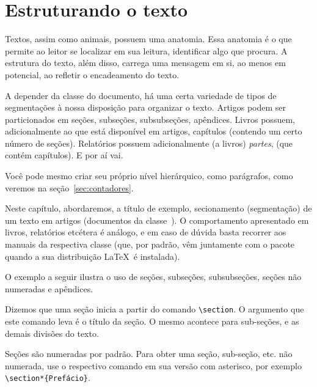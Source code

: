 \section{Estruturando o texto}

Textos, assim como animais, possuem uma anatomia. Essa anatomia é o que permite ao leitor se localizar em sua leitura, identificar algo que procura. A estrutura do texto, além disso, carrega uma mensagem em si, ao menos em potencial, ao refletir o encadeamento do texto.

A depender da classe do documento, há uma certa variedade de tipos de segmentações à nossa disposição para organizar o texto.
Artigos podem ser particionados em seções, subseções, subsubseções, apêndices.
Livros possuem, adicionalmente ao que está disponível em artigos, capítulos (contendo um certo número de seções).
Relatórios possuem adicionalmente (a livros) \emph{partes}, (que contém capítulos).
E por aí vai.

Você pode mesmo criar seu próprio nível hierárquico, como parágrafos, como veremos na seção~\ref{sec:contadores}.

Neste capítulo, abordaremos, a título de exemplo, secionamento (segmentação) de um texto em artigos (documentos da classe~). O comportamento apresentado em livros, relatórios etcétera é análogo, e em caso de dúvida basta recorrer aos manuais da respectiva classe (que, por padrão, vêm juntamente com o pacote quando a sua distribuição \LaTeX\ é instalada).

O exemplo a seguir ilustra o uso de seções, subseções, subsubseções, seções não numeradas e apêndices.


\medskip
{\footnotesize}

\medskip

Dizemos que uma seção inicia a partir do comando \verb'\section'. O
argumento que este comando leva é o título da seção. O mesmo acontece
para sub-seções, e as demais divisões do texto.

Seções são numeradas por padrão. Para obter uma seção, sub-seção, etc. não numerada,
use o respectivo comando em sua versão com asterisco, por
exemplo \verb'\section*{Prefácio}'.

